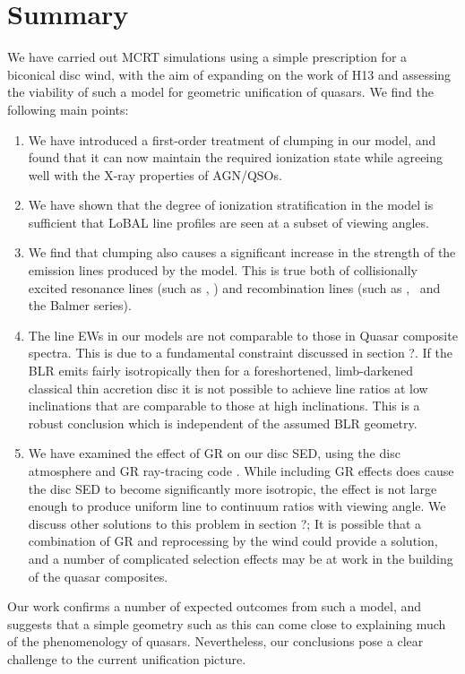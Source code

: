 \documentclass[preprint, a4paper, 11pt]{aastex}
\begin{document}
\section{Summary}

We have carried out MCRT simulations using a simple
prescription for a biconical disc wind, with
the aim of expanding on the work of H13 and assessing 
the viability of such a model for geometric unification of quasars.
We find the following main points:

\begin{enumerate}
\item We have introduced a first-order treatment 
of clumping in our model, and found that it can now maintain
the required ionization state while agreeing well with the X-ray
properties of AGN/QSOs.
\smallskip
\item We have shown that the degree of ionization stratification
in the model is sufficient that LoBAL line profiles
are seen at a subset of viewing angles. 
\smallskip
\item We find that clumping also causes a significant 
increase in the strength of the  emission
lines produced by the model. This is true both
of collisionally excited resonance lines (such as \civ, \nv)
and recombination lines (such as \la, \ha\ and the Balmer series).
\smallskip
\item The line EWs in our models are not comparable to those in Quasar composite
spectra. This is due to a fundamental constraint discussed in section ?. If the BLR
emits fairly isotropically then for a foreshortened, limb-darkened classical thin accretion disc
it is not possible to achieve line ratios at low inclinations that are comparable to
those at high inclinations. This is a robust conclusion which 
is independent of the assumed BLR geometry. 
\smallskip
\item We have examined the effect of GR on our disc SED, using the disc atmosphere
and GR ray-tracing code \agn. While including GR effects
does cause the disc SED to become significantly more isotropic,
the effect is not large enough to produce uniform line to continuum ratios
with viewing angle. We discuss other solutions to this problem in section ?; 
It is possible that a combination of GR and reprocessing by the wind could provide a 
solution, and a number of complicated selection effects may be at work
in the building of the quasar composites.
\end{enumerate}

Our work confirms a number of expected outcomes from such a model, and suggests 
that a simple geometry such as this can come close to explaining much of the 
phenomenology of quasars. Nevertheless, our conclusions pose a clear challenge 
to the current unification picture.
\end{document}
